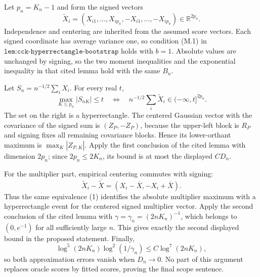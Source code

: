 Let \(p_n=K_n-1\) and form the signed vectors
\[
 \widetilde X_i=(X_{i1},\ldots,X_{ip_n},-X_{i1},\ldots,-X_{ip_n})\in\mathbb R^{2p_n}.
\]
Independence and centering are inherited from the assumed score vectors.  Each signed coordinate has average variance one, so condition (M.1) in \(\texttt{lem:cck-hyperrectangle-bootstrap}\) holds with \(b=1\).  Absolute values are unchanged by signing, so the two moment inequalities and the exponential inequality in that cited lemma hold with the same \(B_n\).

Let \(S_n=n^{-1/2}\sum_iX_i\).  For every real \(t\),
\[
 \max_{K\leq p_n}|S_{nK}|\leq t
 \quad\Longleftrightarrow\quad
 n^{-1/2}\sum_i\widetilde X_i\in(-\infty,t]^{2p_n}.                            \tag{1}
\]
The set on the right is a hyperrectangle.  The centered Gaussian vector with the covariance of the signed sum is \((Z_P,-Z_P)\), because the upper-left block is \(R_P\) and signing fixes all remaining covariance blocks.  Hence its lower-orthant maximum is \(\max_K|Z_{P,K}|\).  Apply the first conclusion of the cited lemma with dimension \(2p_n\); since \(2p_n\leq2K_n\), its bound is at most the displayed \(CD_n\).

For the multiplier part, empirical centering commutes with signing:
\[
 \widetilde X_i-\overline{\widetilde X}
 =(X_i-\overline X,-X_i+\overline X).
\]
Thus the same equivalence (1) identifies the absolute multiplier maximum with a hyperrectangle event for the centered signed multiplier vector.  Apply the second conclusion of the cited lemma with \(\gamma=\gamma_n=(2nK_n)^{-1}\), which belongs to \((0,e^{-1})\) for all sufficiently large \(n\).  This gives exactly the second displayed bound in the proposed statement.  Finally,
\[
 \log^5(2nK_n)\log^2(1/\gamma_n)\leq C\log^7(2nK_n),
\]
so both approximation errors vanish when \(D_n\to0\).  No part of this argument replaces oracle scores by fitted scores, proving the final scope sentence.